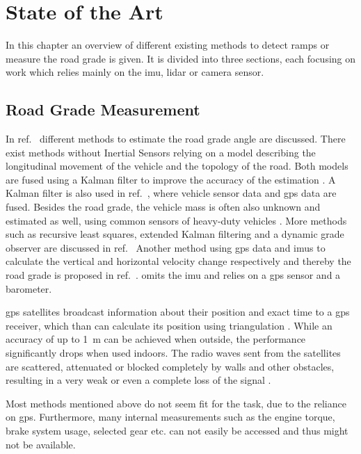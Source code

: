 \chapter{State of the Art}
\label{ch:StateOfTheArt}
In this chapter an overview of different existing methods to detect ramps or measure the road grade is given.
It is divided into three sections, each focusing on work which relies mainly on the \gls{imu}, \gls{lidar} or camera sensor.

\section{Road Grade Measurement}
In ref.~\cite{Jauch2018} different methods to estimate the road grade angle are discussed.
There exist methods without Inertial Sensors relying on a model describing the longitudinal movement of the vehicle and the topology of the road.
Both models are fused using a Kalman filter to improve the accuracy of the estimation \cite{Sahlholm2007}.
A Kalman filter is also used in ref.~\cite{Sahlholm2010}, where vehicle sensor data and \gls{gps} data are fused.
Besides the road grade, the vehicle mass is often also unknown and estimated as well, using common sensors of heavy-duty vehicles \cite{Sahlholm2010, Maleej2014}.
More methods such as recursive least squares, extended Kalman filtering and a dynamic grade observer are discussed in ref.~\cite{Kidambi2014}
Another method using \gls{gps} data and \glspl{imu} to calculate the vertical and horizontal velocity change respectively and thereby the road grade is proposed in ref.~\cite{Ryu2004}.
\cite{YazdaniBoroujeni2014} omits the \gls{imu} and relies on a \gls{gps} sensor and a barometer.\par
\gls{gps} satellites broadcast information about their position and exact time to a \gls{gps} receiver, which than can calculate its position using triangulation \cite{Mainetti2014}.
While an accuracy of up to \SI{1}{\metre} can be achieved when outside, the performance significantly drops when used indoors.
The radio waves sent from the satellites are scattered, attenuated or blocked completely by walls and other obstacles, resulting in a very weak or even a complete loss of the signal \cite{Ozdenizci2015}.\par
Most methods mentioned above do not seem fit for the task, due to the reliance on \gls{gps}.
Furthermore, many internal measurements such as the engine torque, brake system usage, selected gear etc. can not easily be accessed and thus might not be available.\par
